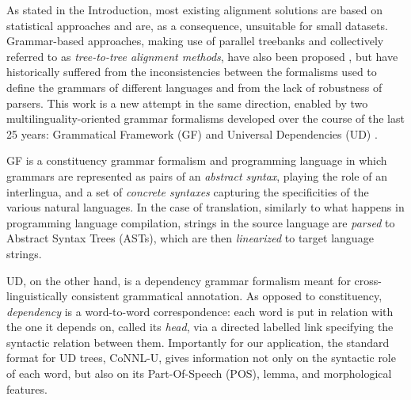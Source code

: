 \documentclass[11pt]{article}
\begin{document}
As stated in the Introduction, most existing alignment solutions are based on statistical approaches and are, as a consequence, unsuitable for small datasets. 
Grammar-based approaches, making use of parallel treebanks and collectively referred to as \textit{tree-to-tree alignment methods}, have also been proposed \cite{tiedemann2011bitext}, but have historically suffered from the inconsistencies between the formalisms used to define the grammars of different languages and from the lack of robustness of parsers.
This work is a new attempt in the same direction, enabled by two multilinguality-oriented grammar formalisms developed over the course of the last 25 years: Grammatical Framework (GF) \cite{ranta-2011} and Universal Dependencies (UD) \cite{ws-2019-universal}.

GF is a constituency grammar formalism and programming language in which grammars are represented as pairs of an \textit{abstract syntax}, playing the role of an interlingua, and a set of \textit{concrete syntaxes} capturing the specificities of the various natural languages. 
In the case of translation, similarly to what happens in programming language compilation, strings in the source language are \textit{parsed} to Abstract Syntax Trees (ASTs), which are then \textit{linearized} to target language strings.

UD, on the other hand, is a dependency grammar formalism meant for cross-linguistically consistent grammatical annotation.
As opposed to constituency, \textit{dependency} is a word-to-word correspondence: each word is put in relation with the one it depends on, called its \textit{head}, via a directed labelled link specifying the syntactic relation between them.
Importantly for our application, the standard format for UD trees, CoNNL-U, gives information not only on the syntactic role of each word, but also on its Part-Of-Speech (POS), lemma, and morphological features.  
\end{document}
